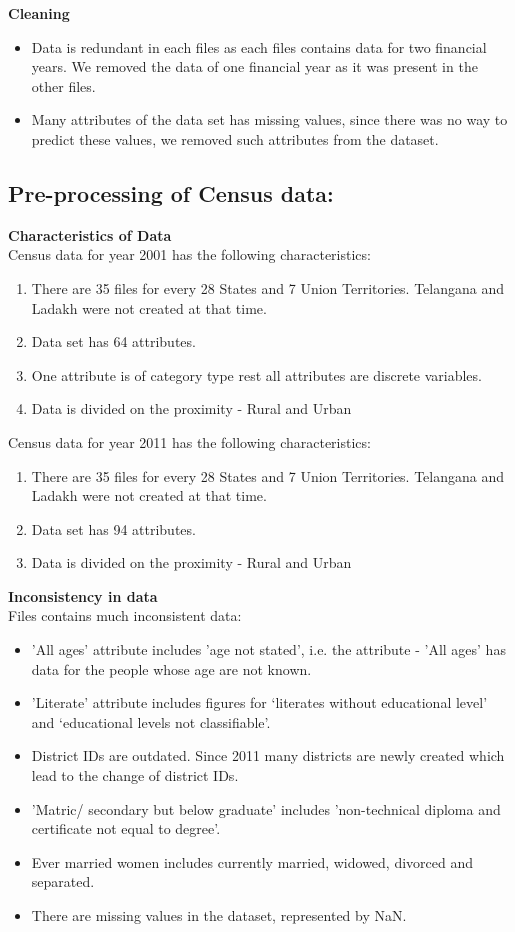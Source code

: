 \documentclass[12pt]{article}
\begin{document}
\bigskip
\textbf{Cleaning}
\begin{itemize}
	\item Data is redundant in each files as each files contains data for two financial years. We removed the data of one financial year as it was present in the other files.
	\item Many attributes of the data set has missing values, since there was no way to predict these values, we removed such attributes from the dataset.  
\end{itemize}


\subsection{Pre-processing of Census data:}

\textbf{Characteristics of Data}\\
Census data for year 2001 has the following characteristics:
\begin{enumerate}
	\item There are 35 files for every 28 States and 7 Union Territories. Telangana and Ladakh were not created at that time.
	\item Data set has 64 attributes.
	\item One attribute is of category type rest all attributes are discrete variables.
	\item Data is divided on the proximity - Rural and Urban
\end{enumerate}


Census data for year 2011 has the following characteristics:
\begin{enumerate}
	\item There are 35 files for every 28 States and 7 Union Territories. Telangana and Ladakh were not created at that time.
	\item Data set has 94 attributes.
	\item Data is divided on the proximity - Rural and Urban
\end{enumerate}

\bigskip
\textbf{Inconsistency in data}\\
Files contains much inconsistent data:
\begin{itemize}
	\item 'All ages’ attribute includes 'age not stated’, i.e. the attribute - 'All ages' has data for the people whose age are not known.
	\item 'Literate’ attribute includes figures for ‘literates without educational level’ and ‘educational levels not classifiable’.
	\item District IDs are outdated. Since 2011 many districts are newly created which lead to the change of district IDs.	
	\item 'Matric/ secondary but below graduate' includes 'non-technical diploma and certificate not equal to degree'.
	\item Ever married women includes currently married, widowed, divorced and separated.	
	\item There are missing values in the dataset, represented by NaN.
\end{itemize}
\end{document}
